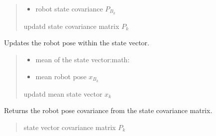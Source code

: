 \documentclass[letterpaper,10pt,english]{sphinxmanual}
\begin{document}
\begin{fulllineitems}
\begin{fulllineitems}
\begin{quote}
\begin{description}
\begin{itemize}
\item {} 
\sphinxAtStartPar
{} \textendash{} robot state covariance \(P_{B_k}\)

\end{itemize}

\sphinxAtStartPar
updatd state covariance matrix \(P_{k}\)

\end{description}\end{quote}

\end{fulllineitems}


\begin{fulllineitems}
\label{\detokenize{FEKFMBLocalization:FEKFMBL.FEKFMBL.SetRobotPose}}
\pysigstartsignatures
{}
\pysigstopsignatures
\sphinxAtStartPar
Updates the robot pose within the state vector.
\begin{quote}\begin{description}
\begin{itemize}
\item {} 
\sphinxAtStartPar
{} \textendash{} mean of the state vector:math:

\item {} 
\sphinxAtStartPar
{} \textendash{} mean robot pose \(x_{B_k}\)

\end{itemize}

\sphinxAtStartPar
updatd mean  state vector \(x_{k}\)

\end{description}\end{quote}

\end{fulllineitems}


\begin{fulllineitems}
\label{\detokenize{FEKFMBLocalization:FEKFMBL.FEKFMBL.GetRobotPoseCovariance}}
\pysigstartsignatures
{}
\pysigstopsignatures
\sphinxAtStartPar
Returns the robot pose covariance from the state covariance matrix.
\begin{quote}\begin{description}
\sphinxAtStartPar
{} \textendash{} state vector covariance matrix \(P_k\)


\end{description}
\end{quote}
\end{fulllineitems}
\end{fulllineitems}
\end{document}
